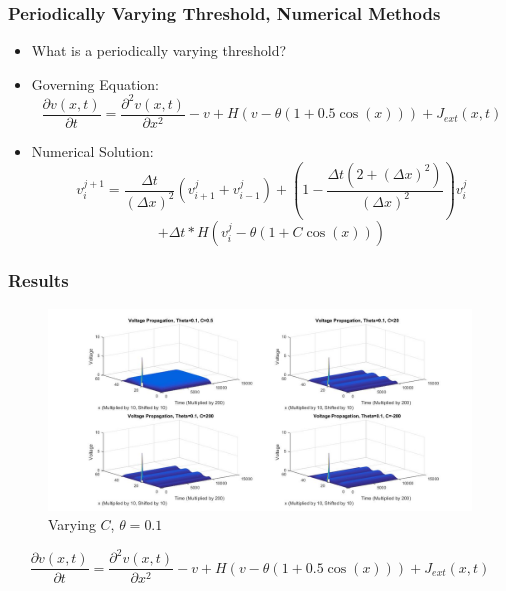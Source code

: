 \documentclass{beamer}
\begin{document}
\begin{frame}
\frametitle{Periodically Varying Threshold, Numerical Methods}
\begin{itemize}
	\item{What is a periodically varying threshold?}
	\item{Governing Equation:}
\[\frac{\partial{v(x,t)}}{\partial{t}}=\frac{\partial^2{v(x,t)}}{\partial{x}^2}-v+H(v-\theta(1+0.5\cos(x)))+J_{ext}(x,t)\]
	\item{Numerical Solution:}
\[v^{j+1}_i=\frac{\Delta{t}}{(\Delta{x})^2}(v^{j}_{i+1}+v^{j}_{i-1})+(1-\frac{\Delta{t}(2+(\Delta{x})^2)}{(\Delta{x})^2})v^{j}_{i}\]
\[+\Delta{t}*H(v^j_i-\theta(1+C\cos(x)))\]
\end{itemize}
\end{frame}


\begin{frame}
\frametitle{Results}
\begin{figure}[H]
  \includegraphics[width=\linewidth]{plotsomething.jpg}
  \caption{Varying $C$, $\theta=0.1$}
  \label{fig:sketch10}
\end{figure}
\[\frac{\partial{v(x,t)}}{\partial{t}}=\frac{\partial^2{v(x,t)}}{\partial{x}^2}-v+H(v-\theta(1+0.5\cos(x)))+J_{ext}(x,t)\]
\end{frame}
\end{document}
